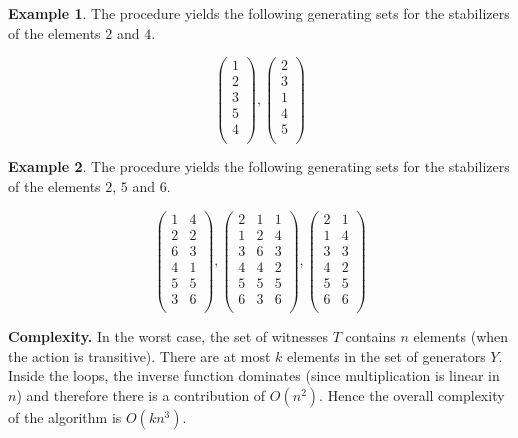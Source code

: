 \documentclass[12pt]{extarticle}
\begin{document}
\textbf{Example 1}. The procedure yields the following generating sets for the stabilizers of the elements $2$ and $4$.

$$\begin{pmatrix} 
  1 \\ 
  2 \\ 
  3 \\ 
  5 \\ 
  4 \\ 
\end{pmatrix} 
,
\begin{pmatrix} 
  2 \\ 
  3 \\ 
  1 \\ 
  4 \\ 
  5 \\ 
\end{pmatrix} $$

\textbf{Example 2}. The procedure yields the following generating sets for the stabilizers of the elements $2$, $5$ and $6$.

$$\begin{pmatrix} 
  1 &  4 \\ 
  2 &  2 \\ 
  6 &  3 \\ 
  4 &  1 \\ 
  5 &  5 \\ 
  3 &  6 \\ 
\end{pmatrix} 
,
\begin{pmatrix} 
  2 &  1 &  1 \\ 
  1 &  2 &  4 \\ 
  3 &  6 &  3 \\ 
  4 &  4 &  2 \\ 
  5 &  5 &  5 \\ 
  6 &  3 &  6 \\ 
\end{pmatrix} 
,
\begin{pmatrix} 
  2 &  1 \\ 
  1 &  4 \\ 
  3 &  3 \\ 
  4 &  2 \\ 
  5 &  5 \\ 
  6 &  6 \\ 
\end{pmatrix} $$

\textbf{Complexity.} In the worst case, the set of witnesses $T$ contains $n$ elements (when the action is transitive). There are at most $k$ elements in the set of generators $Y$. Inside the loops, the inverse function dominates (since multiplication is linear in $n$) and therefore there is a contribution of $O(n^2)$. Hence the overall complexity of the algorithm is $O(kn^3)$. \\
\end{document}
